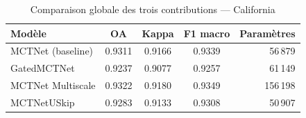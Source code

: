 \begin{table}[H]
\centering
\caption{Comparaison globale des trois contributions — California}
\label{tab:synthese_california}
\begin{tabular}{lcccr}
\toprule
\textbf{Modèle} & \textbf{OA} & \textbf{Kappa} & \textbf{F1 macro} & \textbf{Paramètres} \\
\midrule
MCTNet (baseline) & 0.9311 & 0.9166 & 0.9339 & 56\,879 \\
GatedMCTNet       & 0.9237 & 0.9077 & 0.9257 & 61\,149 \\
MCTNet Multiscale & 0.9322 & 0.9180 & 0.9349 & 156\,198 \\
MCTNetUSkip       & 0.9283 & 0.9133 & 0.9308 & 50\,907 \\
\bottomrule
\end{tabular}
\end{table}

\cleardoublepage
